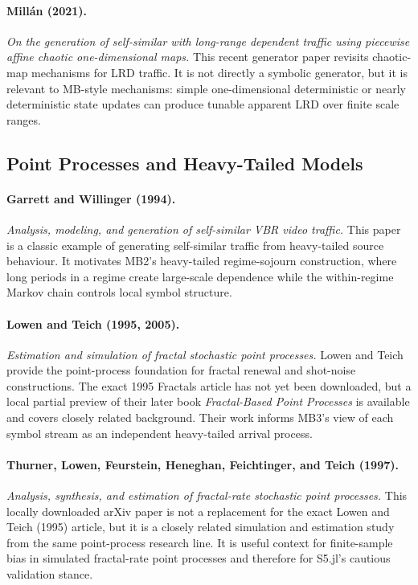 \documentclass[11pt]{article}
\begin{document}
\paragraph{Millán (2021).}
\emph{On the generation of self-similar with long-range dependent traffic using
piecewise affine chaotic one-dimensional maps.}
This recent generator paper revisits chaotic-map mechanisms for LRD traffic. It
is not directly a symbolic generator, but it is relevant to MB-style mechanisms:
simple one-dimensional deterministic or nearly deterministic state updates can
produce tunable apparent LRD over finite scale ranges.

\subsection{Point Processes and Heavy-Tailed Models}

\paragraph{Garrett and Willinger (1994).}
\emph{Analysis, modeling, and generation of self-similar VBR video traffic.}
This paper is a classic example of generating self-similar traffic from
heavy-tailed source behaviour. It motivates MB2's heavy-tailed regime-sojourn
construction, where long periods in a regime create large-scale dependence while
the within-regime Markov chain controls local symbol structure.

\paragraph{Lowen and Teich (1995, 2005).}
\emph{Estimation and simulation of fractal stochastic point processes.}
Lowen and Teich provide the point-process foundation for fractal renewal and
shot-noise constructions. The exact 1995 Fractals article has not yet been
downloaded, but a local partial preview of their later book
\emph{Fractal-Based Point Processes} is available and covers closely related
background. Their work informs MB3's view of each symbol stream as an
independent heavy-tailed arrival process.

\paragraph{Thurner, Lowen, Feurstein, Heneghan, Feichtinger, and Teich (1997).}
\emph{Analysis, synthesis, and estimation of fractal-rate stochastic point
processes.}
This locally downloaded arXiv paper is not a replacement for the exact Lowen and
Teich (1995) article, but it is a closely related simulation and estimation study
from the same point-process research line. It is useful context for finite-sample
bias in simulated fractal-rate point processes and therefore for S5.jl's cautious
validation stance.
\end{document}
